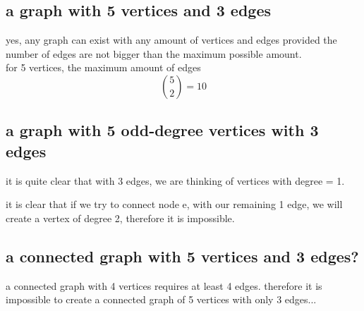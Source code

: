 \documentclass[a4paper,12pt]{article}
\begin{document}
\subsection{a graph with 5 vertices and 3 edges}
yes, any graph can exist with any amount of vertices and edges provided the number of edges are not bigger than the maximum possible amount.\\
for 5 vertices, the maximum amount of edges 
  \[\binom{5}{2} = 10\]
\begin{center}
\end{center}
    
\subsection{a graph with 5 odd-degree vertices with 3 edges}
  it is quite clear that with 3 edges, we are thinking of vertices with
  degree = 1.\\
\begin{center}
\end{center}
it is clear that if we try to connect node e, with our remaining 1 edge,
we will create a vertex of degree 2, therefore it is impossible.
\subsection{a connected graph with 5 vertices and 3 edges?}
a connected graph with 4 vertices requires at least 4 edges.
therefore it is impossible to create a connected graph of 5 vertices with only 3 edges...
\begin{center}
\end{center}
\end{document}
